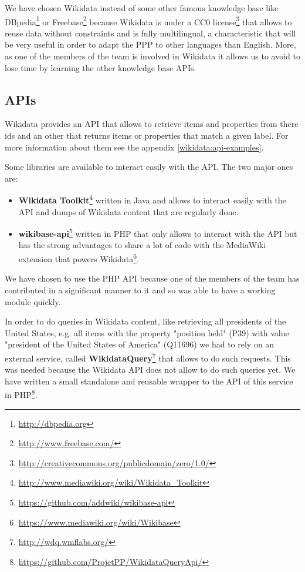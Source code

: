 We have chosen Wikidata instead of some other famous knowledge base like DBpedia\footnote{\url{http://dbpedia.org}} or Freebase\footnote{\url{http://www.freebase.com/}} because Wikidata is under a CC0 license\footnote{\url{http://creativecommons.org/publicdomain/zero/1.0/}} that allows to reuse data without constraints and is fully multilingual, a characteristic that will be very useful in order to adapt the PPP to other languages than English. More, as one of the members of the team is involved in Wikidata it allows us to avoid to lose time by learning the other knowledge base APIs.

\subsection{APIs}
Wikidata provides an API that allows to retrieve items and properties from there ids and an other that returns items or properties that match a given label. For more information about them see the appendix \ref{wikidata:api-examples}.

Some libraries are available to interact easily with the API. The two major ones are:
\begin{itemize}
    \item \textbf{Wikidata Toolkit}\footnote{\url{http://www.mediawiki.org/wiki/Wikidata_Toolkit}} written in Java and allows to interact easily with the API and dumps of Wikidata content that are regularly done.
    \item \textbf{wikibase-api}\footnote{\url{https://github.com/addwiki/wikibase-api}} written in PHP that only allows to interact with the API but has the strong advantages to share a lot of code with the MediaWiki extension that powers Wikidata\footnote{\url{https://www.mediawiki.org/wiki/Wikibase}}.
\end{itemize}

We have chosen to use the PHP API because one of the members of the team has contributed in a significant manner to it and so was able to have a working module quickly.

In order to do queries in Wikidata content, like retrieving all presidents of the United States, e.g. all items with the property "position held" (P39) with value "president of the United States of America" (Q11696) we had to rely on an external service, called \textbf{WikidataQuery}\footnote{\url{http://wdq.wmflabs.org/}} that allows to do such requests. This was needed because the Wikidata API does not allow to do such queries yet. We have written a small standalone and reusable wrapper to the API of this service in PHP\footnote{\url{https://github.com/ProjetPP/WikidataQueryApi/}}.

